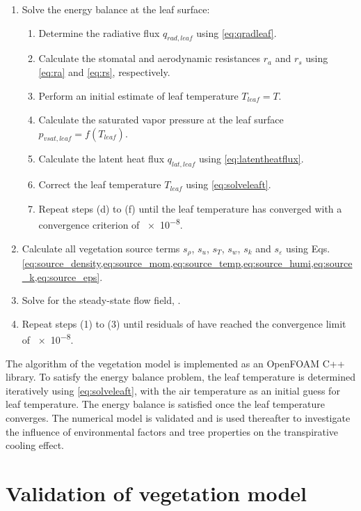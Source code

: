 \begin{enumerate}
\item Solve the energy balance at the leaf surface:
\begin{enumerate}
	\item Determine the radiative flux $q_{\mathit{rad,leaf}}$ using \cref{eq:qradleaf}.
	\item Calculate the stomatal and aerodynamic resistances $r_a$ and $r_s$ using \cref{eq:ra} and \cref{eq:rs}, respectively.
	\item Perform an initial estimate of leaf temperature $T_{\mathit{leaf}}=T$.
	\item Calculate the saturated vapor pressure at the leaf surface $p_{\mathit{vsat,leaf}}=f(T_{\mathit{leaf}})$.
	\item Calculate the latent heat flux $q_{\mathit{lat,leaf}}$ using \cref{eq:latentheatflux}. 
	\item Correct the leaf temperature $T_{\mathit{leaf}}$ using \cref{eq:solveleaft}.
	\item Repeat steps (d) to (f) until the leaf temperature has converged with a convergence criterion of \num{e-8}.
\end{enumerate}
\item Calculate all vegetation source terms $s_\rho$, $s_u$, $s_T$, $s_w$, $s_k$ and $s_{\varepsilon}$ using Eqs. \cref{eq:source_density,eq:source_mom,eq:source_temp,eq:source_humi,eq:source_k,eq:source_eps}.
\item Solve for the steady-state flow field, .
\item Repeat steps (1) to (3) until residuals of  have reached the convergence limit of \num{e-8}.
\end{enumerate}

The algorithm of the vegetation model is implemented as an OpenFOAM C++ library. To satisfy the energy balance problem, the leaf temperature is determined iteratively using \cref{eq:solveleaft}, with the air temperature as an initial guess for leaf temperature. The energy balance is satisfied once the leaf temperature converges. The numerical model is validated and is used thereafter to investigate the influence of environmental factors and tree properties on the transpirative cooling effect.

\section{Validation of vegetation model}

